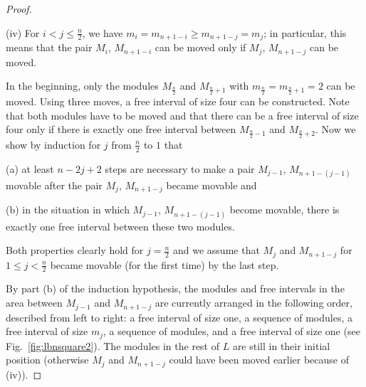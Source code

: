 \documentclass{article}
\begin{document}
\begin{proof}
\begin{list}{}{}
\item[(iv)] For  $i < j \leq \frac{n}2$, we have
$m_i = m_{n+1-i} \geq m_{n+1-j} =m_j$; in particular, this
means that the pair $M_i$, $M_{n+1-i}$ can be
moved only if $M_j$, $M_{n+1-j}$ can be moved.

\end{list}

In the beginning, only the modules $M_{\frac{n}{2}}$ and
$M_{\frac{n}{2}+1}$ with $m_{\frac{n}{2}}=m_{\frac{n}{2}+1}=2$ can
be moved. Using three moves, a free interval of size four can be
constructed. Note that both modules have to be moved and that there
can be a free interval of size four only if there is exactly one free interval 
between $M_{\frac{n}{2}-1}$ and $M_{\frac{n}{2}+2}$. Now we show
by induction for $j$ from $\frac{n}{2}$ to $1$ that
\begin{list}{}{}

\item[(a)] at least $n-2j+2$ steps are necessary to make a pair
$M_{j-1}$, $M_{n+1-(j-1)}$ movable after the pair $M_{j}$,
$M_{n+1-j}$ became movable and

\item[(b)] in the situation in which $M_{j-1}$, $M_{n+1-(j-1)}$
become movable, there is exactly one free interval between these two
modules.

\end{list}

Both properties clearly hold for $j=\frac{n}{2}$ and we assume that
$M_j$ and $M_{n+1-j}$ for $1 \leq j < \frac{n}{2}$ became movable (for
the first time) by the last step.

By part (b) of the induction hypothesis, the modules and free intervals
in the area between $M_{j-1}$ and $M_{n+1-j}$ are currently arranged
in the following order, described from left to right: a free interval 
of size one, a sequence of modules, a free interval of size $m_j$, a
sequence of modules, and a free interval of size one (see 
Fig.~\ref{fig:lbnsquare2}). The modules in the rest of $L$ are still in
their initial position (otherwise $M_j$ and $M_{n+1-j}$ could have
been moved earlier because of (iv)).


\end{proof}
\end{document}
